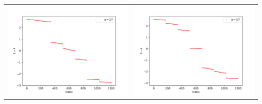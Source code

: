 \documentclass[a4paper,zihao=5,UTF8]{ctexart}
\begin{document}
\begin{table}[htbp]
\begin{tabular}[htbp]{cc}
			\includegraphics[scale=0.5]{5_alpha_2_7.pdf} & \includegraphics[scale=0.5]{5_alpha_3_7.pdf}\\

\end{tabular}
\end{table}
\end{document}
